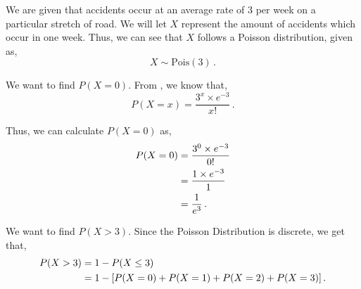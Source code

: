 %
%


\begin{subquestions}
	
\subquestion

We are given that accidents occur at an average rate of 3 per week on a particular stretch of road. We will let $X$ represent the amount of accidents which occur in one week. Thus, we can see that $X$ follows a Poisson distribution, given as,
\begin{equation}
	X \sim \text{Pois}(3) \,.
\end{equation}
	
\begin{subsubquestions}
	
\subsubquestion

We want to find $P(X=0)$. From , we know that,
\begin{equation}
	P(X = x) =\frac{ 3 ^ x \times e^{-3}}{x!} \,. \label{2011:q4:Poisson1}
\end{equation}
	
Thus, we can calculate $P(X=0)$ as,
\begin{align}
	P(X=0) & = \frac{ 3 ^0 \times e^{-3}}{0!} \nonumber \\
	       & = \frac{ 1 \times e^{-3}}{1} \nonumber \\
	       & = \frac{1}{e^3} \,.
\end{align}
	

\subsubquestion

We want to find $P(X > 3)$. Since the Poisson Distribution is discrete, we get that,
\begin{align}
	P(X>3) & =1-P(X \leq 3) \nonumber \\
	       & = 1 - [P(X=0)+P(X=1)+P(X=2)+P(X=3)] \,.
\end{align}


\end{subsubquestions}
\end{subquestions}
